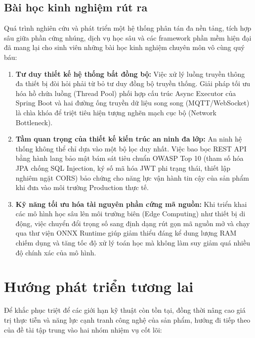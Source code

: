 \documentclass[../DoAn.tex]{subfiles}
\begin{document}
\subsection{Bài học kinh nghiệm rút ra}
Quá trình nghiên cứu và phát triển một hệ thống phân tán đa nền tảng, tích hợp sâu giữa phần cứng nhúng, dịch vụ học sâu và các framework phần mềm hiện đại đã mang lại cho sinh viên những bài học kinh nghiệm chuyên môn vô cùng quý báu:
\begin{enumerate}
    \item \textbf{Tư duy thiết kế hệ thống bất đồng bộ:} Việc xử lý luồng truyền thông đa thiết bị đòi hỏi phải từ bỏ tư duy đồng bộ truyền thống. Giải pháp tối ưu hóa hồ chứa luồng (Thread Pool) phối hợp cấu trúc Async Executor của Spring Boot và hai đường ống truyền dữ liệu song song (MQTT/WebSocket) là chìa khóa để triệt tiêu hiện tượng nghẽn mạch cục bộ (Network Bottleneck).
    \item \textbf{Tầm quan trọng của thiết kế kiến trúc an ninh đa lớp:} An ninh hệ thống không thể chỉ dựa vào một bộ lọc duy nhất. Việc bao bọc REST API bằng hành lang bảo mật bám sát tiêu chuẩn OWASP Top 10 (tham số hóa JPA chống SQL Injection, ký số mã hóa JWT phi trạng thái, thiết lập nghiêm ngặt CORS) bảo chứng cho năng lực vận hành tin cậy của sản phẩm khi đưa vào môi trường Production thực tế.
    \item \textbf{Kỹ năng tối ưu hóa tài nguyên phần cứng mã nguồn:} Khi triển khai các mô hình học sâu lên môi trường biên (Edge Computing) như thiết bị di động, việc chuyển đổi trọng số sang định dạng rút gọn mã nguồn mở và chạy qua thư viện ONNX Runtime giúp giảm thiểu đáng kể dung lượng RAM chiếm dụng và tăng tốc độ xử lý toán học mà không làm suy giảm quá nhiều độ chính xác của mô hình.
\end{enumerate}

\section{Hướng phát triển tương lai}
\label{section:6.2}

Để khắc phục triệt để các giới hạn kỹ thuật còn tồn tại, đồng thời nâng cao giá trị thực tiễn và năng lực cạnh tranh công nghệ của sản phẩm, hướng đi tiếp theo của đề tài tập trung vào hai nhóm nhiệm vụ cốt lõi:
\end{document}
